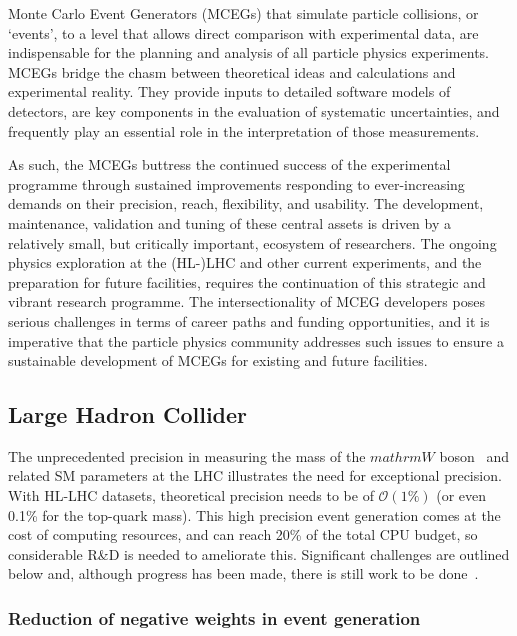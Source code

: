 \documentclass[10pt,a4paper]{article}
\begin{document}
Monte Carlo Event Generators (MCEGs) that simulate particle collisions,
or `events', to a level that allows direct comparison with
experimental data, are indispensable for the planning and analysis of
all particle physics experiments. MCEGs bridge
the chasm between theoretical ideas and calculations
and experimental reality. They provide inputs to
detailed software models of detectors, are key components in the
evaluation of systematic uncertainties, and frequently
play an essential role in the interpretation of those measurements.

As such, the MCEGs buttress the continued success of the experimental programme
through sustained improvements responding to ever-increasing demands on their
precision, reach, flexibility, and usability. The development, maintenance,
validation and tuning of these central assets is driven by a relatively small,
but critically important, ecosystem of researchers. The ongoing physics
exploration at the (HL-)LHC and other current experiments, and the preparation
for future facilities, requires the continuation of this strategic and vibrant
research programme. The intersectionality of MCEG developers poses serious
challenges in terms of career paths and funding opportunities, and it is
imperative that the particle physics community addresses such issues to ensure a
sustainable development of MCEGs for existing and future facilities.

\subsection{Large Hadron Collider}\label{large-hadron-collider}

The unprecedented precision in measuring the mass of the $mathrm{W}$
boson~\cite{CMS:2024lrd} and related SM parameters at the LHC illustrates the
need for exceptional precision. With HL-LHC datasets, theoretical precision
needs to be of $\mathcal{O}(1\%)$ (or even 0.1\% for the top-quark mass). This
high precision event generation comes at the cost of computing resources, and
can reach 20\% of the total CPU budget, so considerable R\&D is needed to
ameliorate this. Significant challenges are outlined below and, although
progress has been made, there is still work to be
done~\cite{HSFPhysicsEventGeneratorWG:2020gxw,maltoni2022tf07snowmassreporttheory,10.21468/SciPostPhys.16.5.130}.

\subsubsection{Reduction of negative weights in event
generation}\label{reduction-of-negative-weights-in-event-generation}
\end{document}
